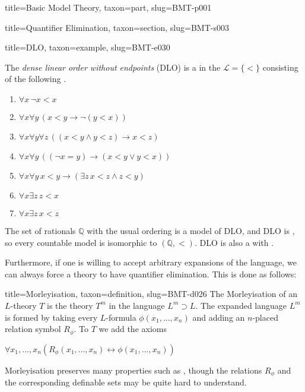 \documentclass[a4paper]{article}
\begin{document}
\begin{tree}{title={Basic Model Theory}, taxon={part}, slug={BMT-p001}}
\begin{tree}{title={Quantifier Elimination}, taxon={section}, slug={BMT-s003}}
  
  
\begin{tree}{title={DLO}, taxon={example}, slug={BMT-e030}}

    The \emph{dense linear order without endpoints} (DLO) is a  in the  \(\mathcal  L= \{ < \}\)
    consisting of the following .
    \begin{enumerate}
\item{\(\forall  x \, \neg  x<x\)}
        \item{\(\forall  x \forall  y \, (x<y \rightarrow \neg (y<x))\)}
        \item{\(\forall  x \forall  y \forall  z \, ((x<y \land  y<z) \rightarrow  x<z)\)}
        \item{\(\forall  x \forall  y \, (( \neg  x=y) \rightarrow (x<y \lor  y<x))\)}
        \item{\(\forall  x \forall  y \, x<y \rightarrow ( \exists  z \, x<z \land  z<y)\)}
        \item{\(\forall  x \exists  z \, z<x\)}
        \item{\(\forall  x \exists  z \, x<z\)}
\end{enumerate}\par{
    The set of rationals \(\mathbb  Q\) with the usual ordering is a model of DLO, and DLO is ,
    so every countable model is isomorphic to \(( \mathbb  Q,<)\). DLO is also a  with
    .
}
\end{tree}

\par{Furthermore, if one is willing to accept arbitrary expansions of the language, we can always force a theory to have quantifier elimination. This is done as follows:}
\begin{tree}{title={Morleyisation}, taxon={definition}, slug={BMT-d026}}
 The Morleyisation of an \(L\)-theory \(T\) is the theory \(T^m\) in the language \(L^m \supset  L\). The expanded language \(L^m\) is formed by taking every \(L\)-formula \(\phi (x_1,...,x_n)\) and adding an \(n\)-placed relation symbol \(R_ \phi\). To \(T\) we add the axioms \par{\(\forall  x_1,...,x_n (R_ \phi  (x_1,...,x_n) \leftrightarrow \phi (x_1,...,x_n)) \)}\par{Morleyisation preserves many properties such as , though the relations \(R_ \phi\) and the corresponding definable sets may be quite hard to understand. }
\end{tree}


\end{tree}
\end{tree}
\end{document}
